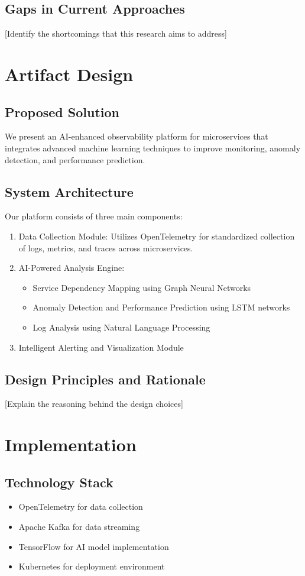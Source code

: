 \documentclass[10pt,journal,compsoc]{IEEEtran}
\begin{document}
\subsection{Gaps in Current Approaches}
[Identify the shortcomings that this research aims to address]

\section{Artifact Design}
\subsection{Proposed Solution}
We present an AI-enhanced observability platform for microservices that integrates advanced machine learning techniques to improve monitoring, anomaly detection, and performance prediction.

\subsection{System Architecture}
Our platform consists of three main components:
\begin{enumerate}
    \item Data Collection Module: Utilizes OpenTelemetry for standardized collection of logs, metrics, and traces across microservices.
    \item AI-Powered Analysis Engine:
    \begin{itemize}
        \item Service Dependency Mapping using Graph Neural Networks
        \item Anomaly Detection and Performance Prediction using LSTM networks
        \item Log Analysis using Natural Language Processing
    \end{itemize}
    \item Intelligent Alerting and Visualization Module
\end{enumerate}

\subsection{Design Principles and Rationale}
[Explain the reasoning behind the design choices]

\section{Implementation}
\subsection{Technology Stack}
\begin{itemize}
    \item OpenTelemetry for data collection
    \item Apache Kafka for data streaming
    \item TensorFlow for AI model implementation
    \item Kubernetes for deployment environment
\end{itemize}
\end{document}
